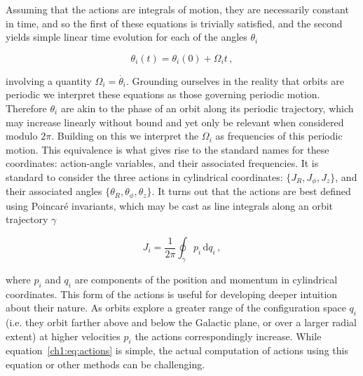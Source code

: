 Assuming that the actions are integrals of motion, they are necessarily constant in time, and so the first of these equations is trivially satisfied, and the second yields simple linear time evolution for each of the angles $\theta_{i}$ 

\begin{equation}
    \label{ch1:eq:angle-evolution}
    \theta_{i}(t) = \theta_{i}(0) + \Omega_{i}t\,,
\end{equation}

\noindent involving a quantity $\Omega_{i} = \dot{\theta_{i}}$. Grounding ourselves in the reality that orbits are periodic we interpret these equations as those governing periodic motion. Therefore $\theta_{i}$ are akin to the phase of an orbit along its periodic trajectory, which may increase linearly without bound and yet only be relevant when considered modulo $2\pi$. Building on this we interpret the $\Omega_{i}$ as frequencies of this periodic motion. This equivalence is what gives rise to the standard names for these coordinates: action-angle variables, and their associated frequencies. It is standard to consider the three actions in cylindrical coordinates: $\{J_{R}, J_{\phi}, J_{z}\}$, and their associated angles $\{\theta_{R}, \theta_{\phi}, \theta_{z}\}$. It turns out that the actions are best defined using Poincar\'{e} invariants, which may be cast as line integrals along an orbit trajectory $\gamma$ 

\begin{equation}
    \label{ch1:eq:actions}
    J_{i} = \frac{1}{2\pi}\oint_{\gamma} p_{i}\, \mathrm{d}q_{i}\,,
\end{equation}

\noindent where $p_{i}$ and $q_{i}$ are components of the position and momentum in cylindrical coordinates. This form of the actions is useful for developing deeper intuition about their nature. As orbits explore a greater range of the configuration space $q_{i}$ (i.e. they orbit farther above and below the Galactic plane, or over a larger radial extent) at higher velocities $p_{i}$ the actions correspondingly increase. While equation~\eqref{ch1:eq:actions} is simple, the actual computation of actions using this equation or other methods can be challenging.

